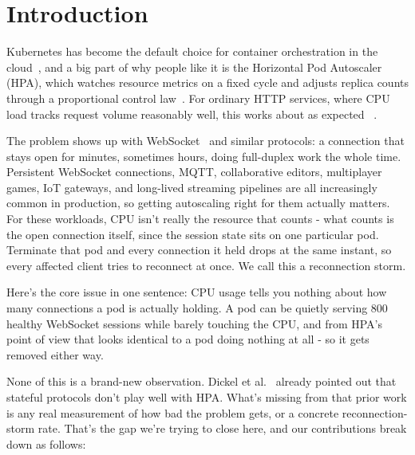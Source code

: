 \documentclass[twocolumn]{svjour3}
\begin{document}


\section{Introduction}
\label{sec:intro}

Kubernetes has become the default choice for container orchestration in the
cloud~\cite{hightower2017kubernetes,merkel2014docker}, and a big part of why people
like it is the Horizontal Pod Autoscaler (HPA), which watches resource metrics on a
fixed cycle and adjusts replica counts through a proportional control
law~\cite{k8s_hpa_docs,nguyen2020hpa,burns2016borg}. For ordinary HTTP services,
where CPU load tracks request volume reasonably well, this works about as expected
~\cite{casalicchio2017auto,lorido2014auto}.

The problem shows up with WebSocket~\cite{websocket_rfc} and similar protocols: a
connection that stays open for minutes, sometimes hours, doing full-duplex work the
whole time. Persistent WebSocket connections, MQTT, collaborative editors,
multiplayer games, IoT gateways, and long-lived streaming pipelines are all
increasingly common in production, so getting autoscaling right for them actually
matters. For these workloads, CPU isn't really the resource that counts -
what counts is the open connection itself, since the session state sits on one
particular pod. Terminate that pod and every connection it held drops at the same
instant, so every affected client tries to reconnect at once. We call this a
reconnection storm.

Here's the core issue in one sentence: CPU usage tells you nothing about
how many connections a pod is actually holding. A pod can be quietly serving 800
healthy WebSocket sessions while barely touching the CPU, and from HPA's point of
view that looks identical to a pod doing nothing at all - so it gets removed
either way.

None of this is a brand-new observation. Dickel et al.~\cite{dickel2019evaluation}
already pointed out that stateful protocols don't play well with HPA. What's
missing from that prior work is any real measurement of how bad the problem gets, or
a concrete reconnection-storm rate. That's the gap we're trying to close here, and
our contributions break down as follows:
\end{document}
